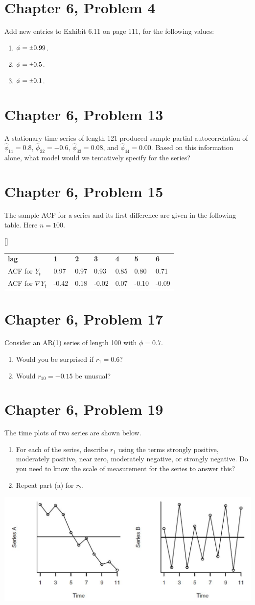\documentclass[11pt]{article}
\newif\ifclearpage
\newcommand{\rpm}{\sbox0{$1$}\sbox2{$\scriptstyle\pm$}
  \raise\dimexpr(\ht0-\ht2)/2\relax\box2 }
\newcommand{\problem}[1]{\section*{#1}}
\newcommand{\solution}{\hrulefill}
\newcommand{\maybeclearpage}{\ifclearpage\clearpage\fi}
\begin{document}
\problem{Chapter 6, Problem 4}
Add new entries to Exhibit 6.11 on page 111, for the following values:
\begin{enumerate}
\item $\phi = \rpm 0.99$.
\item $\phi = \rpm 0.5$.
\item $\phi = \rpm 0.1$.
\end{enumerate}

\solution


\maybeclearpage
\problem{Chapter 6, Problem 13}
A stationary time series of length 121 produced sample partial autocorrelation of $\hat{\phi}_{11} = 0.8$, $\hat{\phi}_{22} = -0.6$, $\hat{\phi}_{33} = 0.08$, and $\hat{\phi}_{44} = 0.00$. Based on this information alone, what model would we tentatively specify for the series?

\solution


\maybeclearpage
\problem{Chapter 6, Problem 15}
The sample ACF for a series and its first difference are given in the following table. Here $n = 100$.

\begin{center}[]
\begin{tabular}{lllllll}
 \textbf{lag} & \textbf{1} & \textbf{2} & \textbf{3} & \textbf{4} & \textbf{5} & \textbf{6} \\
 ACF for $Y_t$ & 0.97 & 0.97 & 0.93 & 0.85 & 0.80 & 0.71 \\
 ACF for $\nabla Y_t$ & -0.42 & 0.18 & -0.02 & 0.07 & -0.10 & -0.09
\end{tabular}
\end{center}

\solution

\maybeclearpage
\problem{Chapter 6, Problem 17}
Consider an AR(1) series of length 100 with $\phi = 0.7$.
\begin{enumerate}
\item Would you be surprised if $r_1 = 0.6$?
\item Would $r_{10} = -0.15$ be unusual?
\end{enumerate}

\solution


\maybeclearpage
\problem{Chapter 6, Problem 19}
The time plots of two series are shown below.
\begin{enumerate}
	\item For each of the series, describe $r_1$ using the terms strongly positive, moderately positive, near zero, moderately negative, or strongly negative. Do you need to know the scale of measurement for the series to answer this?
	\item Repeat part (a) for $r_2$.
\end{enumerate}

\centerline{\includegraphics{graphs.jpg}}

\solution


\maybeclearpage
\end{document}
